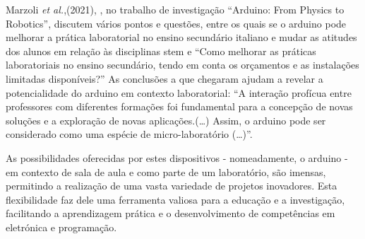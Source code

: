Marzoli \textit{et al.},(2021), \cite{Marzoli}, no trabalho de investigação ``Arduino: From Physics to Robotics'', discutem vários pontos e questões, entre os quais se o \gls{arduino} pode melhorar a prática laboratorial no ensino secundário italiano e mudar as atitudes dos alunos em relação às disciplinas \acrshort{stem} e ``Como melhorar as práticas laboratoriais no ensino secundário, tendo em conta os orçamentos e as instalações limitadas disponíveis?''
As conclusões a que chegaram ajudam a revelar a potencialidade do \gls{arduino} em contexto laboratorial: ``A interação profícua entre professores com diferentes formações foi fundamental para a concepção de novas soluções e a exploração de novas aplicações.(\ldots) Assim, o \gls{arduino} pode ser considerado como uma espécie de micro-laboratório (\ldots)''\cite{Marzoli}.

As possibilidades oferecidas por estes dispositivos - nomeadamente, o \gls{arduino} - em contexto de sala de aula e como parte de um laboratório, são imensas, permitindo a realização de uma vasta variedade de projetos inovadores. Esta flexibilidade faz dele uma ferramenta valiosa para a educação e a investigação, facilitando a aprendizagem prática e o desenvolvimento de competências em eletrónica e programação.

